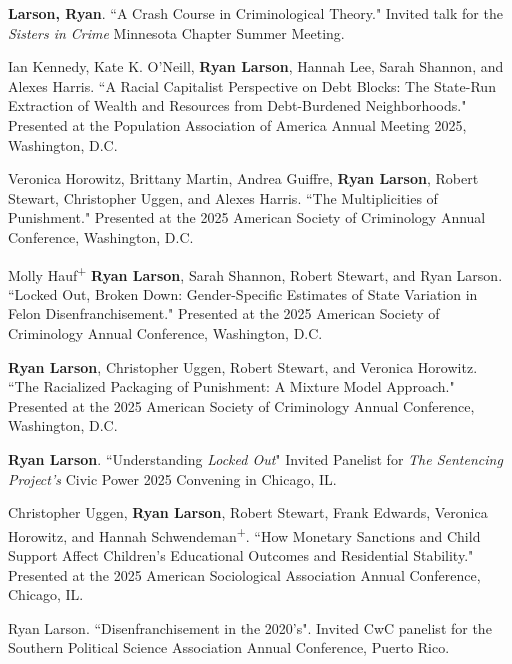 \documentclass[letterpaper]{article}
\newenvironment{publist}{%
  \begin{list}{}{%
    \setlength{\leftmargin}{0cm}   %
    \setlength{\labelwidth}{2cm}     %
    \setlength{\labelsep}{0.5cm}     %
  }%
}{%
  \end{list}%
}
\begin{document}
\begin{publist}
\item \textbf{Larson, Ryan}. ``A Crash Course in Criminological Theory." Invited talk for the \textit{Sisters in Crime} Minnesota Chapter Summer Meeting.  

\item [\textbf{2025}] Ian Kennedy, Kate K. O'Neill, \textbf{Ryan Larson}, Hannah Lee, Sarah Shannon, and Alexes Harris. ``A Racial Capitalist Perspective on Debt Blocks: The State-Run Extraction of Wealth and Resources from Debt-Burdened Neighborhoods." Presented at the Population Association of America Annual Meeting 2025, Washington, D.C. 

\item Veronica Horowitz, Brittany Martin, Andrea Guiffre, \textbf{Ryan Larson}, Robert Stewart, Christopher Uggen, and Alexes Harris. ``The Multiplicities of Punishment." Presented at the 2025 American Society of Criminology Annual Conference, Washington, D.C. 

\item Molly Hauf\textsuperscript{+} \textbf{Ryan Larson}, Sarah Shannon, Robert Stewart, and Ryan Larson. ``Locked Out, Broken Down: Gender-Specific Estimates of State Variation in Felon Disenfranchisement." Presented at the 2025 American Society of Criminology Annual Conference, Washington, D.C. 

\item \textbf{Ryan Larson}, Christopher Uggen, Robert Stewart, and Veronica Horowitz. ``The Racialized Packaging of Punishment: A Mixture Model Approach." Presented at the 2025 American Society of Criminology Annual Conference, Washington, D.C. 

\item \textbf{Ryan Larson}. ``Understanding \textit{Locked Out}" Invited Panelist for \textit{The Sentencing Project's} Civic Power 2025 Convening in Chicago, IL. 

\item Christopher Uggen, \textbf{Ryan Larson}, Robert Stewart, Frank Edwards, Veronica Horowitz, and Hannah Schwendeman\textsuperscript{+}. ``How Monetary Sanctions and Child Support Affect Children's Educational Outcomes and Residential Stability." Presented at the 2025 American Sociological Association Annual Conference, Chicago, IL. 

\item Ryan Larson. ``Disenfranchisement in the 2020's". Invited CwC panelist for the Southern Political Science Association Annual Conference, Puerto Rico. 


\end{publist}
\end{document}
